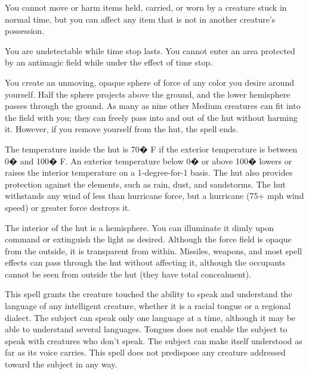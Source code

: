 \begin{multicols}{2}
\begin{small}
\smallskip\noindent You cannot move or harm items held, carried, or worn by a creature stuck in normal time, but you can affect any item that is not in another creature's possession.

\smallskip\noindent You are undetectable while time stop lasts. You cannot enter an area protected by an antimagic field while under the effect of time stop.

\noindent You create an unmoving, opaque sphere of force of any color you desire around yourself. Half the sphere projects above the ground, and the lower hemisphere passes through the ground. As many as nine other Medium creatures can fit into the field with you; they can freely pass into and out of the hut without harming it. However, if you remove yourself from the hut, the spell ends.

\smallskip\noindent The temperature inside the hut is 70� F if the exterior temperature is between 0� and 100� F. An exterior temperature below 0� or above 100� lowers or raises the interior temperature on a 1-degree-for-1 basis. The hut also provides protection against the elements, such as rain, dust, and sandstorms. The hut withstands any wind of less than hurricane force, but a hurricane (75+ mph wind speed) or greater force destroys it.

\smallskip\noindent The interior of the hut is a hemisphere. You can illuminate it dimly upon command or extinguish the light as desired. Although the force field is opaque from the outside, it is transparent from within. Missiles, weapons, and most spell effects can pass through the hut without affecting it, although the occupants cannot be seen from outside the hut (they have total concealment).


\noindent This spell grants the creature touched the ability to speak and understand the language of any intelligent creature, whether it is a racial tongue or a regional dialect. The subject can speak only one language at a time, although it may be able to understand several languages. Tongues does not enable the subject to speak with creatures who don't speak. The subject can make itself understood as far as its voice carries. This spell does not predispose any creature addressed toward the subject in any way.


\end{small}
\end{multicols}
